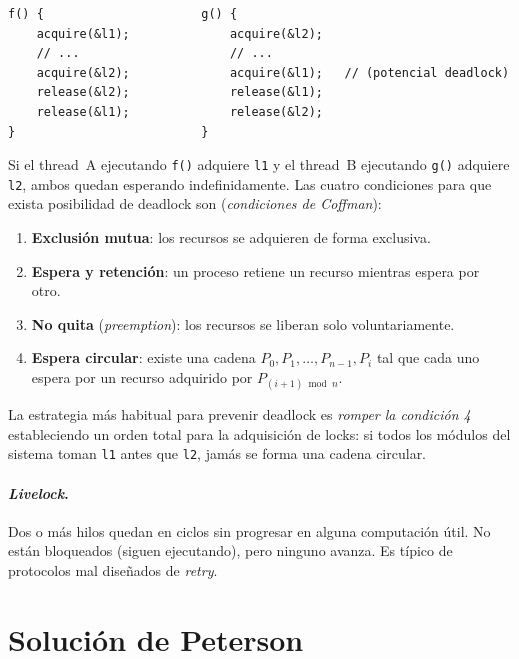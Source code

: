 \documentclass[11pt,a4paper]{article}
\begin{document}
\begin{lstlisting}[style=cstyle]
f() {                      g() {
    acquire(&l1);              acquire(&l2);
    // ...                     // ...
    acquire(&l2);              acquire(&l1);   // (potencial deadlock)
    release(&l2);              release(&l1);
    release(&l1);              release(&l2);
}                          }
\end{lstlisting}

Si el thread~A ejecutando \texttt{f()} adquiere \texttt{l1} y el
thread~B ejecutando \texttt{g()} adquiere \texttt{l2}, ambos quedan
esperando indefinidamente. Las cuatro condiciones para que exista
posibilidad de deadlock son (\emph{condiciones de Coffman}):

\begin{enumerate}[leftmargin=*,nosep]
    \item \textbf{Exclusión mutua}: los recursos se adquieren de
        forma exclusiva.
    \item \textbf{Espera y retención}: un proceso retiene un recurso
        mientras espera por otro.
    \item \textbf{No quita} (\emph{preemption}): los recursos se
        liberan solo voluntariamente.
    \item \textbf{Espera circular}: existe una cadena
        $P_0, P_1, \dots, P_{n-1}, P_i$ tal que cada uno espera por un
        recurso adquirido por $P_{(i+1) \bmod n}$.
\end{enumerate}

La estrategia más habitual para prevenir deadlock es \emph{romper la
condición 4} estableciendo un orden total para la adquisición de
locks: si todos los módulos del sistema toman \texttt{l1} antes que
\texttt{l2}, jamás se forma una cadena circular.

\paragraph{\emph{Livelock}.} Dos o más hilos quedan en ciclos sin
progresar en alguna computación útil. No están bloqueados (siguen
ejecutando), pero ninguno avanza. Es típico de protocolos mal
diseñados de \emph{retry}.

\section{Solución de Peterson}
\end{document}
